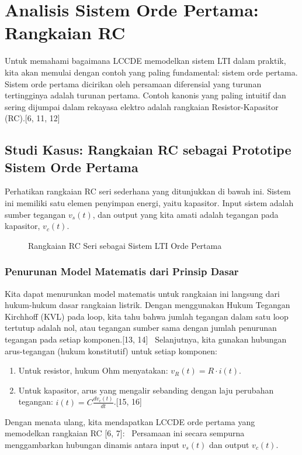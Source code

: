 \documentclass[12pt, a4paper]{article}
\begin{document}
\section{Analisis Sistem Orde Pertama: Rangkaian RC}
Untuk memahami bagaimana LCCDE memodelkan sistem LTI dalam praktik, kita akan memulai dengan contoh yang paling fundamental: sistem orde pertama. Sistem orde pertama dicirikan oleh persamaan diferensial yang turunan tertingginya adalah turunan pertama. Contoh kanonis yang paling intuitif dan sering dijumpai dalam rekayasa elektro adalah rangkaian Resistor-Kapasitor (RC).[6, 11, 12]

\subsection{Studi Kasus: Rangkaian RC sebagai Prototipe Sistem Orde Pertama}
Perhatikan rangkaian RC seri sederhana yang ditunjukkan di bawah ini. Sistem ini memiliki satu elemen penyimpan energi, yaitu kapasitor. Input sistem adalah sumber tegangan $v_s(t)$, dan output yang kita amati adalah tegangan pada kapasitor, $v_c(t)$.

\begin{figure}[H]
    \centering
    \caption{Rangkaian RC Seri sebagai Sistem LTI Orde Pertama}
    \label{fig:rc-circuit}
\end{figure}

\subsubsection{Penurunan Model Matematis dari Prinsip Dasar}
Kita dapat menurunkan model matematis untuk rangkaian ini langsung dari hukum-hukum dasar rangkaian listrik. Dengan menggunakan Hukum Tegangan Kirchhoff (KVL) pada loop, kita tahu bahwa jumlah tegangan dalam satu loop tertutup adalah nol, atau tegangan sumber sama dengan jumlah penurunan tegangan pada setiap komponen.[13, 14]
\
Selanjutnya, kita gunakan hubungan arus-tegangan (hukum konstitutif) untuk setiap komponen:
\begin{enumerate}
    \item Untuk resistor, hukum Ohm menyatakan: $v_R(t) = R \cdot i(t)$.
    \item Untuk kapasitor, arus yang mengalir sebanding dengan laju perubahan tegangan: $i(t) = C \frac{dv_c(t)}{dt}$.[15, 16]
\end{enumerate}
Dengan menata ulang, kita mendapatkan LCCDE orde pertama yang memodelkan rangkaian RC [6, 7]:
\
Persamaan ini secara sempurna menggambarkan hubungan dinamis antara input $v_s(t)$ dan output $v_c(t)$.
\end{document}

